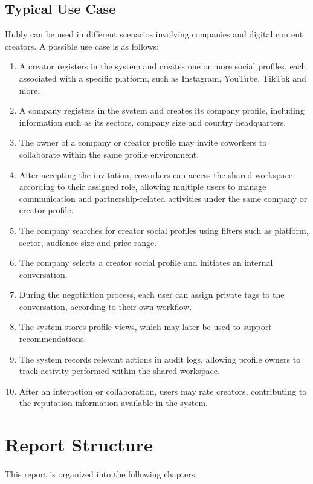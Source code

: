 \subsection{Typical Use Case}
Hubly can be used in different scenarios involving companies and digital content creators. A possible use case is as follows:
\begin{enumerate}
    \item A creator registers in the system and creates one or more social profiles, each associated with a specific platform, such as Instagram, YouTube, TikTok and more.
    \item A company registers in the system and creates its company profile, including information such as its sectors, company size and country headquarters.
    \item The owner of a company or creator profile may invite coworkers to collaborate within the same profile environment.
    \item After accepting the invitation, coworkers can access the shared workspace according to their assigned role, allowing multiple users to manage communication and partnership-related activities under the same company or creator profile.
    \item The company searches for creator social profiles using filters such as platform, sector, audience size and price range.
    \item The company selects a creator social profile and initiates an internal conversation.
    \item During the negotiation process, each user can assign private tags to the conversation, according to their own workflow.
    \item The system stores profile views, which may later be used to support recommendations.
    \item The system records relevant actions in audit logs, allowing profile owners to track activity performed within the shared workspace.
    \item After an interaction or collaboration, users may rate creators, contributing to the reputation information available in the system.
\end{enumerate}

 

\section{Report Structure}

\paragraph{}This report is organized into the following chapters:

